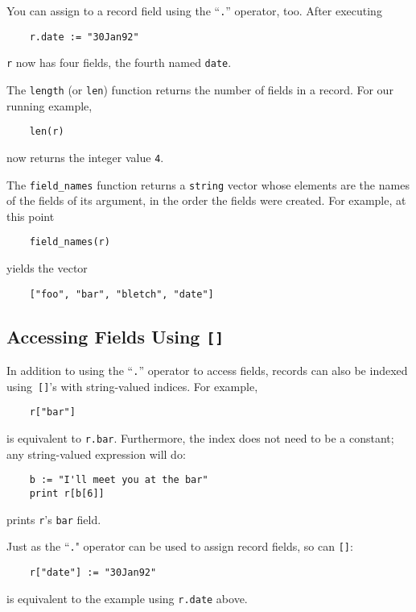 You can assign to a record field using the ``{\tt .}'' operator, too.  After
executing
\begin{verbatim}
    r.date := "30Jan92"
\end{verbatim}
{\tt r} now has four fields, the fourth named {\tt date}.

The {\tt length} (or {\tt len}) function returns the number of fields
in a record.  For our running example,
\begin{verbatim}
    len(r)
\end{verbatim}
now returns the integer value {\tt 4}.

The {\tt field\_names} function returns a {\tt string} vector whose elements
are the names of the fields of its argument, in the order the
fields were created.  For example, at this point
\begin{verbatim}
    field_names(r)
\end{verbatim}
yields the vector
\begin{verbatim}
    ["foo", "bar", "bletch", "date"]
\end{verbatim}

\subsection{Accessing Fields Using {\tt []}}
\label{record-brackets}

In addition to using the ``{\tt .}'' operator to access fields,
records can also be indexed using~{\tt []}'s with string-valued indices.
For example,
\begin{verbatim}
    r["bar"]
\end{verbatim}
is equivalent to {\tt r.bar}.  Furthermore, the index does not need
to be a constant; any string-valued expression will do:
\begin{verbatim}
    b := "I'll meet you at the bar"
    print r[b[6]]
\end{verbatim}
prints {\tt r}'s {\tt bar} field.

Just as the ``{\tt .}" operator can be used to assign record fields, so
can {\tt []}:
\begin{verbatim}
    r["date"] := "30Jan92"
\end{verbatim}
is equivalent to the example using {\tt r.date} above.

